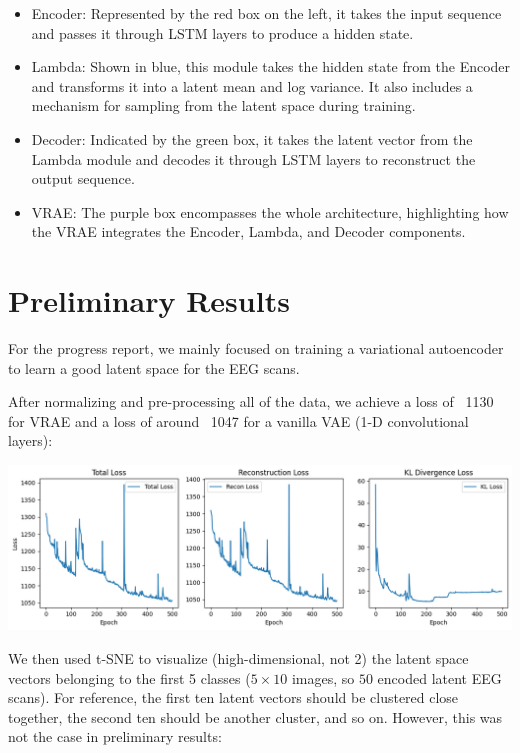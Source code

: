 \documentclass{article}
\begin{document}
\begin{itemize}
    \item Encoder: Represented by the red box on the left, it takes the input sequence and passes it through LSTM layers to produce a hidden state.
    \item Lambda: Shown in blue, this module takes the hidden state from the Encoder and transforms it into a latent mean and log variance. It also includes a mechanism for sampling from the latent space during training.
    \item Decoder: Indicated by the green box, it takes the latent vector from the Lambda module and decodes it through LSTM layers to reconstruct the output sequence.
    \item VRAE: The purple box encompasses the whole architecture, highlighting how the VRAE integrates the Encoder, Lambda, and Decoder components.
\end{itemize}


\section{Preliminary Results}

For the progress report, we mainly focused on training a variational autoencoder to learn a good latent space for the EEG scans. 

After normalizing and pre-processing all of the data, we achieve a loss of ~1130 for VRAE and a loss of around ~1047 for a vanilla VAE (1-D convolutional layers):

\includegraphics[scale = 0.5]{cs236b.png}

We then used t-SNE to visualize (high-dimensional, not 2) the latent space vectors belonging to the first 5 classes ($5 \times 10$ images, so $50$ encoded latent EEG scans). For reference, the first ten latent vectors should be clustered close together, the second ten should be another cluster, and so on. However, this was not the case in preliminary results: 
\end{document}
